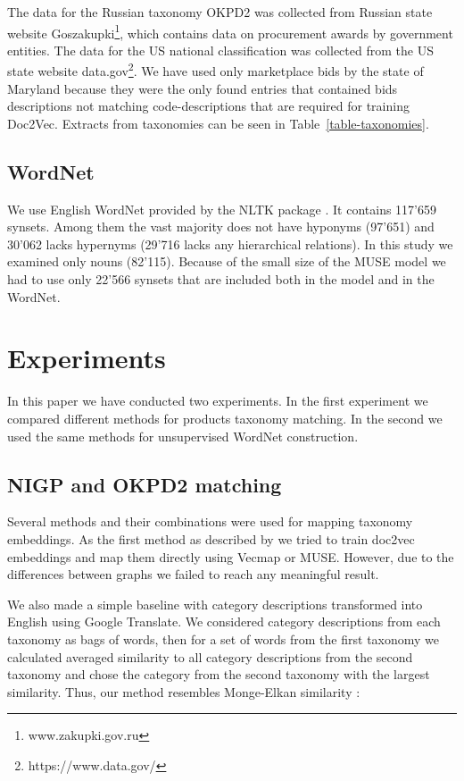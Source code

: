 \documentclass[11pt,a4paper]{article}
\begin{document}
The data for the Russian taxonomy OKPD2 was collected from Russian state website Goszakupki\footnote{www.zakupki.gov.ru}, which contains data on procurement awards by government entities.
The data for the US national classification was collected from the US state website data.gov\footnote{https://www.data.gov/}. We have used only marketplace bids by the state of Maryland because they were the only found entries that contained bids descriptions not matching code-descriptions that are required for training Doc2Vec. Extracts from taxonomies can be seen in Table~\ref{table-taxonomies}.

\subsection{WordNet}
We use English WordNet provided by the NLTK package \cite{wordnet,nltk}. It contains 117'659 synsets. Among them the vast majority does not have hyponyms (97'651) and 30'062 lacks hypernyms (29'716 lacks any hierarchical relations). In this study we examined only nouns (82'115). Because of the small size of the MUSE model we had to use only 22'566 synsets that are included both in the model and in the WordNet.
\section{Experiments}
In this paper we have conducted two experiments. In the first experiment we compared different methods for products taxonomy matching. In the second we used the same methods for unsupervised WordNet construction.
\subsection{NIGP and OKPD2 matching}
Several methods and their combinations were used for mapping taxonomy embeddings. As the first method as described by \cite{gordeev-fruct}  we tried to train doc2vec embeddings and map them directly using Vecmap or MUSE. However, due to the differences between graphs we failed to reach any meaningful result.

We also made a simple baseline with category descriptions transformed into English using Google Translate. We considered category descriptions from each taxonomy as bags of words, then for a set of words from the first taxonomy we calculated averaged similarity to all category descriptions from the second taxonomy and chose the category from the second taxonomy with the largest similarity. Thus, our method resembles Monge-Elkan similarity \cite[p.~111]{dupe-detect}:
\end{document}
